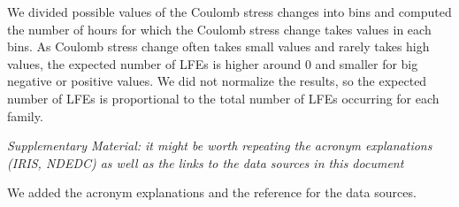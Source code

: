 \documentclass[letterpaper, 12pt]{article}
\begin{document}
\bigskip

We divided possible values of the Coulomb stress changes into bins and computed the number of hours for which the Coulomb stress change takes values in each bins. As Coulomb stress change often takes small values and rarely takes high values, the expected number of LFEs is higher around 0 and smaller for big negative or positive values. We did not normalize the results, so the expected number of LFEs is proportional to the total number of LFEs occurring for each family.

\bigskip

\textit{Supplementary Material: it might be worth repeating the acronym explanations (IRIS, NDEDC) as well as the links to the data sources in this document}

\bigskip

We added the acronym explanations and the reference for the data sources.
\end{document}
